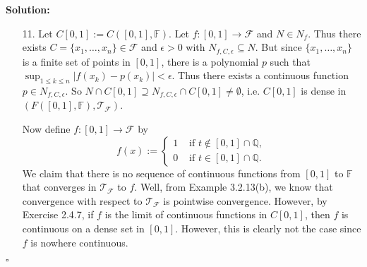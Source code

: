 \documentclass[12pt]{article}
\newcounter{ProofCounter}
\newenvironment{Solution}{\stepcounter{ProofCounter}\textbf{Solution:}}{\hfill$\square$}
\begin{document}
\begin{Solution}
\begin{enumerate}
      (b) Let $F$ be closed in in Spec$(\mathcal{R})$. Then there exists an ideal $I$ of $\mathcal{R}$ such that $F = V(I)$. Note that since
      $\phi^{-1}$ is also a unital homomorphism, $\phi(I)$ is an ideal of $\mathcal{S}$ by part (a). Thus,
      \begin{align*}
        (\phi^*)^{-1}[F] & = \left\{ p \in \text{Spec}(\mathcal{S}) : \phi^*(p) \in F \right\} \\
        & = \left\{ p \in \text{Spec}(\mathcal{S}) : \phi^{-1}[p] \in F \right\} \\
        & = \left\{ p \in \text{Spec}(\mathcal{S}) : \phi^{-1}[p] \in \text{Spec}(\mathcal{R}) \wedge \phi^{-1}[p] \supseteq I \right\} \\
        \text{(by part (a), since $\phi^{-1}[p]$ is a prime ideal)}\  & = \left\{ p \in \text{Spec}(\mathcal{S}) : \phi^{-1}[p] \supseteq I \right\} \\
        & = V(\phi(I)),
      \end{align*}
      which by definition is closed in Spec$(\mathcal{S})$. Hence $\phi^*$ is continuous.

    \item[11.] Let $C[0,1]:=C([0,1], \mathbb{F})$.
      Let $f : [0,1] \rightarrow \mathcal{F}$ and $N \in N_f$. Thus there exists $C = \{x_1, \dots, x_n\} \in
      \mathcal{F}$ and $\epsilon > 0$ with $N_{f,C,\epsilon} \subseteq N$. But since $\{x_1, \dots, x_n\}$ is a finite set of points in $[0,1]$,
      there is a polynomial $p$ such that $\sup_{1\leq k \leq n}|f(x_k) - p(x_k)| < \epsilon$. Thus there exists a continuous function $p \in
      N_{f,C,\epsilon}$. So $N \cap C[0,1] \supseteq N_{f,C,\epsilon}\cap C[0,1] \neq \emptyset$, i.e. $C[0,1]$ is dense in
      $(F([0,1],\mathbb{F}),\mathcal{T}_{\mathcal{F}})$.

      Now define $f : [0,1] \rightarrow \mathcal{F}$ by
      \[
        f(x) := \left\{ \begin{array}{cl}
            1 & \text{ if } t \notin [0,1] \cap \mathbb{Q}, \\
            0 & \text{ if } t \in [0,1] \cap \mathbb{Q}.
        \end{array} \right.
      \]
      We claim that there is no sequence of continuous functions from $[0,1]$ to $\mathbb{F}$ that converges in $\mathcal{T}_{\mathcal{F}}$ to $f$.
      Well, from Example 3.2.13(b), we know that convergence with respect to $\mathcal{T}_{\mathcal{F}}$ is pointwise convergence. However, by
      Exercise 2.4.7, if $f$ is the limit of continuous functions in $C[0,1]$, then $f$ is continuous on a dense set in $[0,1]$.
      However, this is clearly not the case since $f$ is nowhere continuous.
  \end{enumerate}
\end{Solution}
\end{document}
